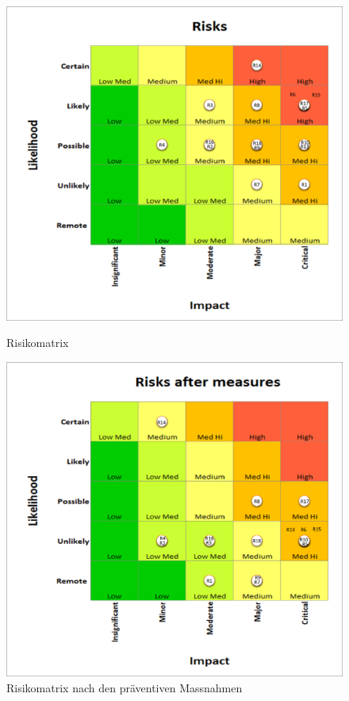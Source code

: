 \begin{figure}[H]
  \centering
  \begin{minipage}[t]{0.45\linewidth}
  \includegraphics[width=1.0\textwidth]{img/risikomanagement/Risks.png}
  \caption{Risikomatrix}
  \label{fig:risk-matrix}
  \end{minipage} 
  \hfill
  \begin{minipage}[t]{0.45\linewidth}
  \includegraphics[width=1.0\textwidth]{img/risikomanagement/RisksAfterMeasures.png}
  \caption{Risikomatrix nach den präventiven Massnahmen}
  \label{fig:risk-matrix-after-measures}
  \end{minipage}
\end{figure}
  
